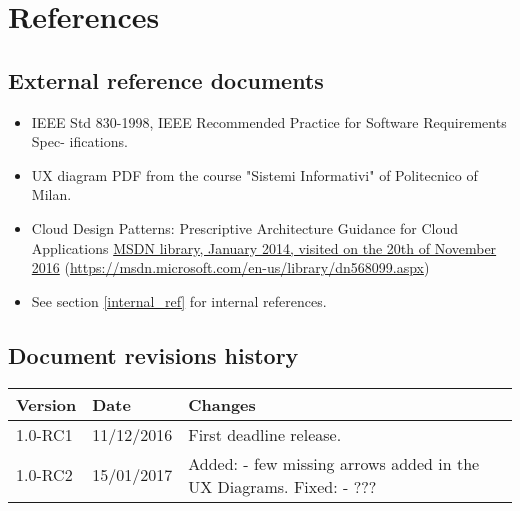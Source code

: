 \section{References}

\subsection{External reference documents}
\label{external_ref}
\begin{itemize}
    \item IEEE Std 830-1998, IEEE Recommended Practice for Software Requirements Spec- ifications.
    \item UX diagram PDF from the course "Sistemi Informativi" of Politecnico of Milan.
    \item Cloud Design Patterns: Prescriptive Architecture Guidance for Cloud Applications \href{https://msdn.microsoft.com/en-us/library/dn568099.aspx}{MSDN library, January 2014, visited on the 20th of November 2016} (\url{https://msdn.microsoft.com/en-us/library/dn568099.aspx})
    \item See section \ref{internal_ref} for internal references.
\end{itemize}



\subsection{Document revisions history}
\begin{tabular}{| l | l | p{10cm} |}
\hline
\textbf{Version} & \textbf{Date} & \textbf{Changes}\\
\hline
1.0-RC1 & 11/12/2016 & First deadline release.\\
\hline
1.0-RC2 & 15/01/2017 & Added:\newline
    - few missing arrows added in the UX Diagrams.\newline
    Fixed:\newline
    - ???\\
\hline
\end{tabular} 
